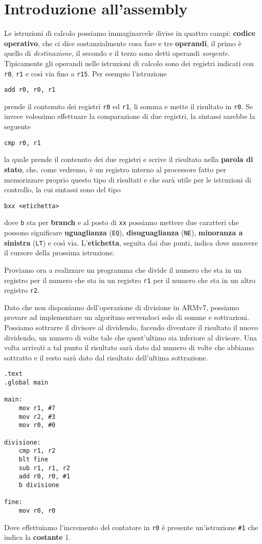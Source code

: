 \section{Introduzione all'assembly}
Le istruzioni di calcolo possiamo immaginarcele divise in quattro campi: \textbf{codice operativo},
che ci dice sostanzialmente cosa fare e tre \textbf{operandi}, il primo è quello di
\emph{destinazione}, il secondo e il terzo sono detti operandi \emph{sorgente}. Tipicamente gli
operandi nelle istruzioni di calcolo sono dei registri indicati con \verb|r0|, \verb|r1| e così
via fino a \verb|r15|. Per esempio l'istruzione
\begin{verbatim}
add r0, r0, r1
\end{verbatim}
prende il contenuto dei registri \verb|r0| ed \verb|r1|, li somma e mette il risultato in \verb|r0|.
Se invece volessimo effettuare la comparazione di due registri, la sintassi sarebbe la seguente
\begin{verbatim}
cmp r0, r1
\end{verbatim}
la quale prende il contenuto dei due registri e scrive il risultato nella \textbf{parola di stato},
che, come vedremo, è un registro interno al processore fatto per memorizzare proprio questo tipo
di risultati e che sarà utile per le istruzioni di controllo, la cui sintassi sono del tipo
\begin{verbatim}
bxx <etichetta>
\end{verbatim}
dove \verb|b| sta per \textbf{branch} e al posto di \verb|xx| possiamo mettere due caratteri che
possono significare \textbf{uguaglianza} (\verb|EQ|), \textbf{disuguaglianza} (\verb|NE|),
\textbf{minoranza a sinistra} (\verb|LT|) e così via. L'\textbf{etichetta}, seguita dai due punti,
indica dove muovere il cursore della prossima istruzione.

Proviamo ora a realizzare un programma che divide il numero che sta in un registro per il numero
che sta in un registro \verb|r1| per il numero che sta in un altro registro \verb|r2|.

Dato che non disponiamo dell'operazione di divisione in ARMv7, possiamo provare ad implementare un
algoritmo servendoci solo di somme e sottrazioni. Possiamo sottrarre il divisore al dividendo,
facendo diventare il risultato il nuovo dividendo, un numero di volte tale che quest'ultimo sia
inferiore al divisore. Una volta arrivati a tal punto il risultato sarà dato dal numero di volte
che abbiamo sottratto e il resto sarà dato dal risultato dell'ultima sottrazione.
\begin{verbatim}
.text
.global main

main:
	mov r1, #7
	mov r2, #3
	mov r0, #0

divisione:
	cmp r1, r2
	blt fine
	sub r1, r1, r2
	add r0, r0, #1
	b divisione

fine:
	mov r0, r0
\end{verbatim}
Dove effettuiamo l'incremento del contatore in \verb|r0| è presente un'istruzione \verb|#1| che
indica la \textbf{costante} 1.